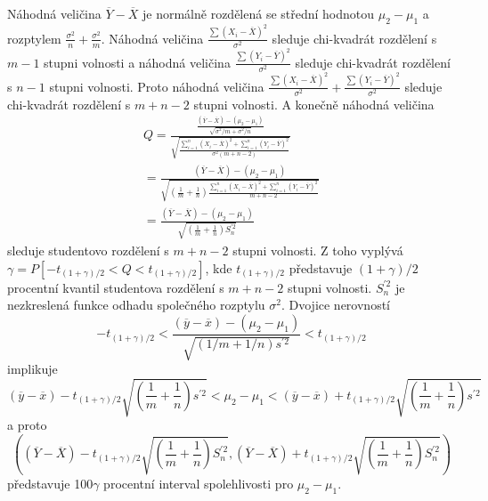 Náhodná veličina $\overline{Y} - \overline{X}$ je normálně rozdělená se střední hodnotou $\mu_2 - \mu_1$ a rozptylem $\frac{\sigma^2}{n} + \frac{\sigma^2}{m}$. Náhodná veličina $\frac{\sum (X_i - \overline{X})^2}{\sigma^2}$ sleduje chi-kvadrát rozdělení s $m - 1$ stupni volnosti a náhodná veličina $\frac{\sum (Y_i - \overline{Y})^2}{\sigma^2}$ sleduje chi-kvadrát rozdělení s $n - 1$ stupni volnosti. Proto náhodná veličina $\frac{\sum (X_i - \overline{X})^2}{\sigma^2} + \frac{\sum (Y_i - \overline{Y})^2}{\sigma^2}$ sleduje chi-kvadrát rozdělení s $m + n - 2$ stupni volnosti. A konečně náhodná veličina
\begin{gather*}
Q = \frac{\frac{(\overline{Y} - \overline{X}) - (\mu_2 - \mu_1)}{\sqrt{\sigma^2/m + \sigma^2/n}}}{\sqrt{\frac{\sum_{i = 1}^n (X_i - \overline{X})^2 + \sum_{i = 1}^n(Y_i - \overline{Y})^2}{\sigma^2(m + n - 2)}}}\\
= \frac{(\overline{Y} - \overline{X}) - (\mu_2 - \mu_1)}{\sqrt{\left(\frac{1}{m} + \frac{1}{n} \right)\frac{\sum_{i = 1}^n(X_i - \overline{X})^2 + \sum_{i = 1}^n (Y_i - \overline{Y})^2}{m + n - 2}}}\\
= \frac{(\overline{Y} - \overline{X}) - (\mu_2 - \mu_1)}{\sqrt{\left(\frac{1}{m} + \frac{1}{n} \right)S_n^{'2}}}
\end{gather*}
sleduje studentovo rozdělení s $m + n - 2$ stupni volnosti. Z toho vyplývá $\gamma = P[-t_{(1 + \gamma) / 2} < Q < t_{(1 + \gamma) / 2}]$, kde $t_{(1 + \gamma) / 2}$ představuje $(1 + \gamma) / 2$ procentní kvantil studentova rozdělení s $m + n - 2$ stupni volnosti. $S_n^{'2}$ je nezkreslená funkce odhadu společného rozptylu $\sigma^2$. Dvojice nerovností
\begin{equation*}
- t_{(1 + \gamma) / 2} < \frac{(\overline{y} - \overline{x}) - (\mu_2 - \mu_1)}{\sqrt{(1/m + 1/n)\mathit{s}^{'2}}} < t_{(1 + \gamma)/2}
\end{equation*}
implikuje
\begin{equation*}
(\overline{y} - \overline{x}) - t_{(1 + \gamma) / 2} \sqrt{\left(\frac{1}{m} + \frac{1}{n} \right)\mathit{s}^{'2}} < \mu_2 - \mu_1 < (\overline{y} - \overline{x}) +  t_{(1 + \gamma) / 2} \sqrt{\left(\frac{1}{m} + \frac{1}{n} \right)\mathit{s}^{'2}}
\end{equation*}
a proto
\begin{equation*}
\left((\overline{Y} - \overline{X}) - t_{(1 + \gamma) / 2} \sqrt{\left(\frac{1}{m} + \frac{1}{n} \right)S_n^{'2}}, (\overline{Y} - \overline{X}) + t_{(1 + \gamma) / 2} \sqrt{\left(\frac{1}{m} + \frac{1}{n}\right)S_n^{'2}}\right)
\end{equation*}
představuje 100$\gamma$ procentní interval spolehlivosti pro $\mu_2 - \mu_1$.

